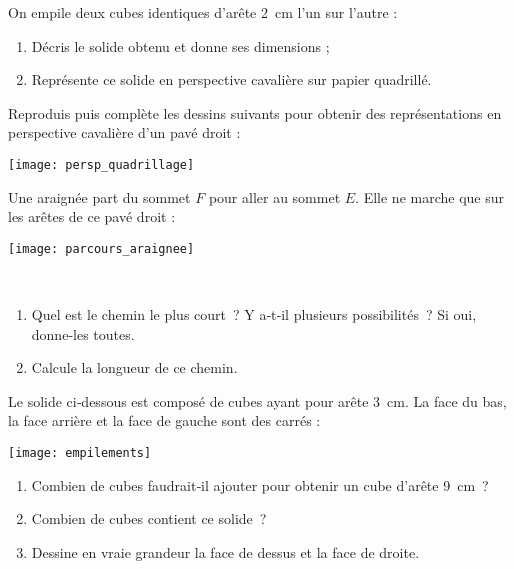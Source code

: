 \begin{exercice}
On empile deux cubes identiques d'arête 2 cm l'un sur l'autre :
\begin{enumerate}
 \item Décris le solide obtenu et donne ses dimensions ;
 \item Représente ce solide en perspective cavalière sur papier quadrillé.
 \end{enumerate}
\end{exercice}


\begin{exercice}
Reproduis puis complète les dessins suivants pour obtenir des représentations en perspective cavalière d'un pavé droit :
\begin{center} \texttt{[image: persp\_quadrillage]} \end{center}
\end{exercice}


\begin{exercice}[Araignée]
\begin{minipage}[c]{0.52\linewidth}
Une araignée part du sommet $F$ pour aller au sommet $E$. Elle ne marche que sur les arêtes de ce pavé droit :
 \end{minipage} \hfill%
 \begin{minipage}[c]{0.44\linewidth}
  \texttt{[image: parcours\_araignee]}
  \end{minipage} \\
\begin{enumerate}
 \item Quel est le chemin le plus court ? Y a‑t‑il plusieurs possibilités ? Si oui, donne‑les toutes.
 \item Calcule la longueur de ce chemin.
 \end{enumerate}
\end{exercice}


\begin{exercice}[Empilements]
Le solide ci‑dessous est composé de cubes ayant pour arête 3 cm. La face du bas, la face arrière et la face de gauche sont des carrés :
\begin{center} \texttt{[image: empilements]} \end{center}
\begin{enumerate}
 \item Combien de cubes faudrait‑il ajouter pour obtenir un cube d'arête 9 cm ?
 \item Combien de cubes contient ce solide ?
 \item Dessine en vraie grandeur la face de dessus et la face de droite.
 \end{enumerate}
\end{exercice}



